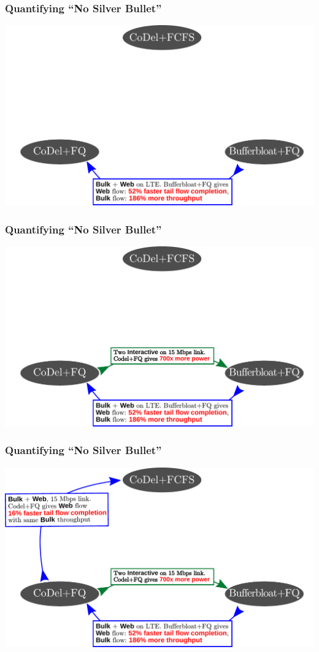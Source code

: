 \begin{frame}[plain]
\frametitle{Quantifying ``No Silver Bullet''}
\begin{center}
\includegraphics[width=\columnwidth]{fig-5.pdf}
\end{center}
\end{frame}

\begin{frame}[plain]
\frametitle{Quantifying ``No Silver Bullet''}
\begin{center}
\includegraphics[width=\columnwidth]{fig-4.pdf}
\end{center}
\end{frame}

\begin{frame}[plain]
\frametitle{Quantifying ``No Silver Bullet''}
\begin{center}
\includegraphics[width=\columnwidth]{fig-3.pdf}
\end{center}
\end{frame}

